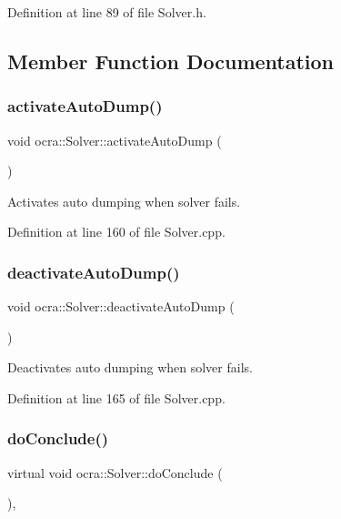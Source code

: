 Definition at line 89 of file Solver.\+h.



\subsection{Member Function Documentation}
\hypertarget{classocra_1_1Solver_abe008748e898aff38d0c13c4c9edbe5a}{}\label{classocra_1_1Solver_abe008748e898aff38d0c13c4c9edbe5a} 
\subsubsection{\texorpdfstring{activate\+Auto\+Dump()}{activateAutoDump()}}
{\footnotesize\ttfamily void ocra\+::\+Solver\+::activate\+Auto\+Dump (\begin{DoxyParamCaption}{ }\end{DoxyParamCaption})}

Activates auto dumping when solver fails. 

Definition at line 160 of file Solver.\+cpp.

\hypertarget{classocra_1_1Solver_a4b766c5ed75ce93245fecb64ae115adb}{}\label{classocra_1_1Solver_a4b766c5ed75ce93245fecb64ae115adb} 
\subsubsection{\texorpdfstring{deactivate\+Auto\+Dump()}{deactivateAutoDump()}}
{\footnotesize\ttfamily void ocra\+::\+Solver\+::deactivate\+Auto\+Dump (\begin{DoxyParamCaption}{ }\end{DoxyParamCaption})}

Deactivates auto dumping when solver fails. 

Definition at line 165 of file Solver.\+cpp.

\hypertarget{classocra_1_1Solver_ac9d2d41d544b57a75e0d03db073d646e}{}\label{classocra_1_1Solver_ac9d2d41d544b57a75e0d03db073d646e} 
\subsubsection{\texorpdfstring{do\+Conclude()}{doConclude()}}
{\footnotesize\ttfamily virtual void ocra\+::\+Solver\+::do\+Conclude (\begin{DoxyParamCaption}{ }\end{DoxyParamCaption})\hspace{0.3cm}{\ttfamily [protected]}, {}}



